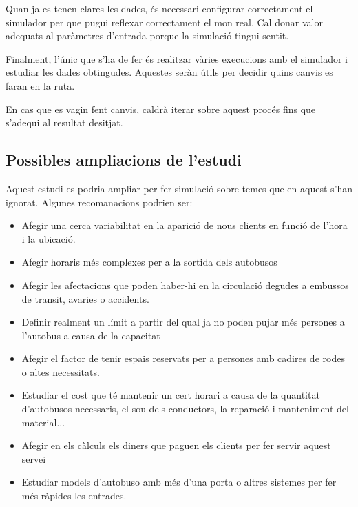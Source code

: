 \documentclass[a4paper,10pt]{article}
\begin{document}
Quan ja es tenen clares les dades, és necessari configurar correctament el simulador per que pugui reflexar correctament el mon real. Cal donar valor adequats al paràmetres d'entrada porque la simulació tingui sentit.

Finalment, l'únic que s'ha de fer és realitzar vàries execucions amb el simulador i estudiar les dades obtingudes. Aquestes seràn útils per decidir quins canvis es faran en la ruta.

En cas que es vagin fent canvis, caldrà iterar sobre aquest procés fins que s'adequi al resultat desitjat.


\subsection{Possibles ampliacions de l'estudi}

Aquest estudi es podria ampliar per fer simulació sobre temes que en aquest s'han ignorat. Algunes recomanacions podrien ser:
\begin{itemize}
 \item Afegir una cerca variabilitat en la aparició de nous clients en funció de l'hora i la ubicació.
 \item Afegir horaris més complexes per a la sortida dels autobusos
 \item Afegir les afectacions que poden haber-hi en la circulació degudes a embussos de transit, avaries o accidents.
 \item Definir realment un límit a partir del qual ja no poden pujar més persones a l'autobus a causa de la capacitat
 \item Afegir el factor de tenir espais reservats per a persones amb cadires de rodes o altes necessitats.
 \item Estudiar el cost que té mantenir un cert horari a causa de la quantitat d'autobusos necessaris, el sou dels conductors, la reparació i manteniment del material...
 \item Afegir en els càlculs els diners que paguen els clients per fer servir aquest servei
 \item Estudiar models d'autobuso amb més d'una porta o altres sistemes per fer més ràpides les entrades.
\end{itemize}
\end{document}
